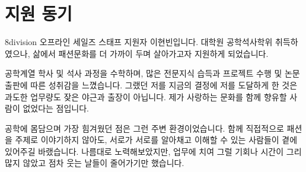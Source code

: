  
 
 
 

\section*{지원 동기}
8division 오프라인 세일즈 스태프 지원자 이현빈입니다. 대학원 공학석사학위 취득하였으나, 삶에서 패션문화를 더 가까이 두며 살아가고자 지원하게 되었습니다.

공학계열 학사 및 석사 과정을 수학하며, 많은 전문지식 습득과 프로젝트 수행 및 논문출판에 따른 성취감을 느꼈습니다. 그랬던 저를 지금의 결정에 저를 도달하게 한 것은 과도한 업무량도 잦은 야근과 출장이 아닙니다. 제가 사랑하는 문화를 함께 향유할 사람이 없었다는 점입니다.

공학에 몸담으며 가장 힘겨웠던 점은 그런 주변 환경이었습니다. 함께 직접적으로 패션을 주제로 이야기하지 않아도, 서로가 서로를 알아채고 이해할 수 있는 사람들이 곁에 있어주길 바랬습니다. 나름대로 노력해보았지만, 업무에 치여 그럴 기회나 시간이 그리 많지 않았고 점차 웃는 날들이 줄어가기만 했습니다.

